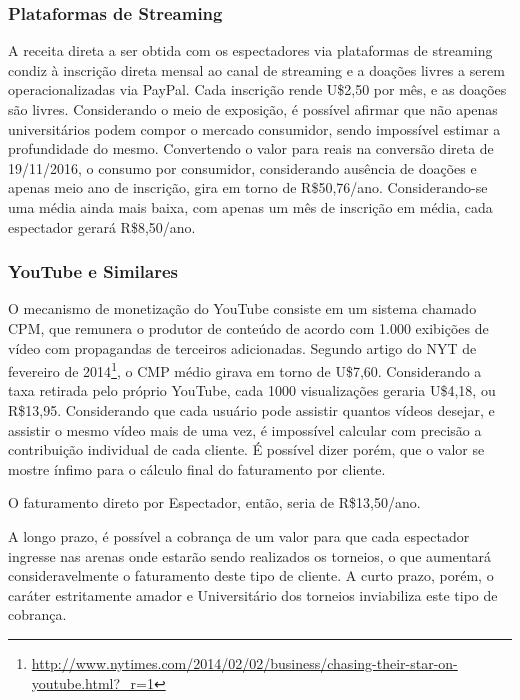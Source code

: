 \documentclass[a4paper, 12pt]{paper}
\begin{document}
\subsubsection{Plataformas de Streaming}

A receita direta a ser obtida com os espectadores via plataformas de streaming condiz à inscrição direta mensal ao canal de streaming e a doações livres a serem operacionalizadas via PayPal. Cada inscrição rende U\$2,50 por mês, e as doações são livres. Considerando o meio de exposição, é possível afirmar que não apenas universitários podem compor o mercado consumidor, sendo impossível estimar a profundidade do mesmo. Convertendo o valor para reais na conversão direta de 19/11/2016, o consumo por consumidor, considerando ausência de doações e apenas meio ano de inscrição, gira em torno de R\$50,76/ano. Considerando-se uma média ainda mais baixa, com apenas um mês de inscrição em média, cada espectador gerará R\$8,50/ano.

\subsubsection{YouTube e Similares}
O mecanismo de monetização do YouTube consiste em um sistema chamado CPM, que remunera o produtor de conteúdo de acordo com 1.000 exibições de vídeo com propagandas de terceiros adicionadas. Segundo artigo do NYT de fevereiro de 2014\footnote{\url{http://www.nytimes.com/2014/02/02/business/chasing-their-star-on-youtube.html?_r=1}}, o CMP médio girava em torno de U\$7,60. Considerando a taxa retirada pelo próprio YouTube, cada 1000 visualizações geraria U\$4,18, ou  R\$13,95. Considerando que cada usuário pode assistir quantos vídeos desejar, e assistir o mesmo vídeo mais de uma vez, é impossível calcular com precisão a contribuição individual de cada cliente. É possível dizer porém, que o valor se mostre ínfimo para o cálculo final do faturamento por cliente.

O faturamento direto por Espectador, então, seria de R\$13,50/ano.

A longo prazo, é possível a cobrança de um valor para que cada espectador ingresse nas arenas onde estarão sendo realizados os torneios, o que aumentará consideravelmente o faturamento deste tipo de cliente. A curto prazo, porém, o caráter estritamente amador e Universitário dos torneios inviabiliza este tipo de cobrança.
\end{document}
